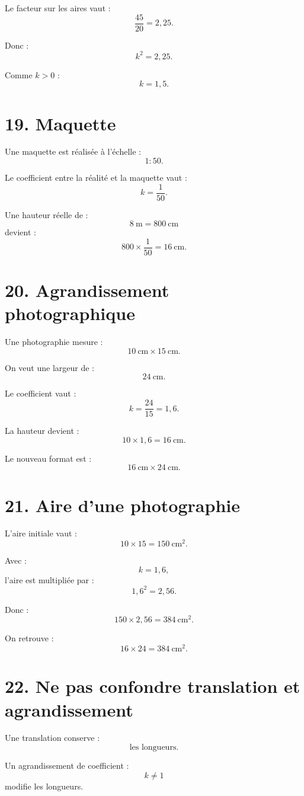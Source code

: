 Le facteur sur les aires vaut :
\[
\dfrac{45}{20}=2{,}25.
\]

Donc :
\[
k^2=2{,}25.
\]

Comme $k>0$ :
\[
k=1{,}5.
\]

\section{19. Maquette}

Une maquette est réalisée à l'échelle :
\[
1:50.
\]

Le coefficient entre la réalité et la maquette vaut :
\[
k=\dfrac1{50}.
\]

Une hauteur réelle de :
\[
8\ \text{m}=800\ \text{cm}
\]
devient :
\[
800\times\dfrac1{50}=16\ \text{cm}.
\]

\section{20. Agrandissement photographique}

Une photographie mesure :
\[
10\ \text{cm}\times15\ \text{cm}.
\]

On veut une largeur de :
\[
24\ \text{cm}.
\]

Le coefficient vaut :
\[
k=\dfrac{24}{15}=1{,}6.
\]

La hauteur devient :
\[
10\times1{,}6=16\ \text{cm}.
\]

Le nouveau format est :
\[
\boxed{16\ \text{cm}\times24\ \text{cm}}.
\]

\section{21. Aire d'une photographie}

L'aire initiale vaut :
\[
10\times15=150\ \text{cm}^2.
\]

Avec :
\[
k=1{,}6,
\]
l'aire est multipliée par :
\[
1{,}6^2=2{,}56.
\]

Donc :
\[
150\times2{,}56=384\ \text{cm}^2.
\]

On retrouve :
\[
16\times24=384\ \text{cm}^2.
\]

\section{22. Ne pas confondre translation et agrandissement}

Une translation conserve :
\[
\text{les longueurs}.
\]

Un agrandissement de coefficient :
\[
k\neq1
\]
modifie les longueurs.

